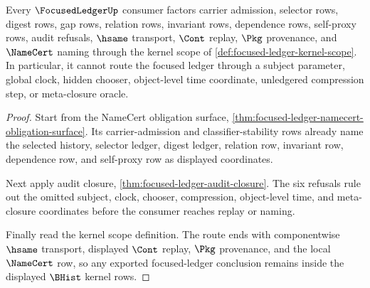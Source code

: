 \begin{theorem}
\label{thm:focused-ledger-kernel-scope-route}
Every $\FocusedLedgerUp$ consumer factors carrier admission, selector rows, digest rows, gap rows, relation rows, invariant rows, dependence rows, self-proxy rows, audit refusals, $\hsame$ transport, $\Cont$ replay, $\Pkg$ provenance, and $\NameCert$ naming through the kernel scope of \autoref{def:focused-ledger-kernel-scope}. In particular, it cannot route the focused ledger through a subject parameter, global clock, hidden chooser, object-level time coordinate, unledgered compression step, or meta-closure oracle.
\end{theorem}
\begin{proof}
Start from the NameCert obligation surface, \autoref{thm:focused-ledger-namecert-obligation-surface}. Its carrier-admission and classifier-stability rows already name the selected history, selector ledger, digest ledger, relation row, invariant row, dependence row, and self-proxy row as displayed coordinates.

Next apply audit closure, \autoref{thm:focused-ledger-audit-closure}. The six refusals rule out the omitted subject, clock, chooser, compression, object-level time, and meta-closure coordinates before the consumer reaches replay or naming.

Finally read the kernel scope definition. The route ends with componentwise $\hsame$ transport, displayed $\Cont$ replay, $\Pkg$ provenance, and the local $\NameCert$ row, so any exported focused-ledger conclusion remains inside the displayed $\BHist$ kernel rows.
\end{proof}

